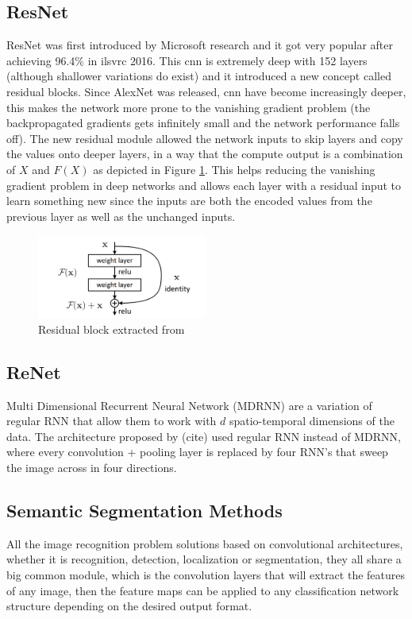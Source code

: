 \subsection{ResNet}
ResNet \cite{DBLP:journals/corr/HeZRS15} was first introduced by Microsoft research and it got very popular after achieving 96.4\% in \gls{ilsvrc} 2016. This \gls{cnn} is extremely deep with 152 layers (although shallower variations do exist) and it introduced a new concept called residual blocks. Since AlexNet was released, \gls{cnn} have become increasingly deeper, this makes the network more prone to the vanishing gradient problem (the backpropagated gradients gets infinitely small and the network performance falls off). The new residual module allowed the network inputs to skip layers and copy the values onto deeper layers, in a way that the compute output is a combination of $X$ and $F(X)$ as depicted in Figure \ref{fig:residual}. This helps reducing the vanishing gradient problem in deep networks and allows each layer with a residual input to learn something new since the inputs are both the encoded values from the previous layer as well as the unchanged inputs.

\begin{figure}
	\includegraphics[width=0.5\textwidth]{archivos/residual.png}
	\centering
	\caption{Residual block extracted from \cite{DBLP:journals/corr/HeZRS15}}
	\label{fig:residual}
\end{figure}

\subsection{ReNet}
Multi Dimensional Recurrent Neural Network (MDRNN) are a variation of regular RNN that allow them to work with $d$ spatio-temporal dimensions of the data. The architecture proposed by (cite) used regular RNN instead of MDRNN, where every convolution + pooling layer is replaced by four RNN's that sweep the image across in four directions. 

\subsection{Semantic Segmentation Methods}
\label{sec:segmentation_variants}
All the image recognition problem solutions based on convolutional architectures, whether it is recognition, detection, localization or segmentation, they all share a big common module, which is the convolution layers that will extract the features of any image, then the feature maps can be applied to any classification network structure depending on the desired output format.

